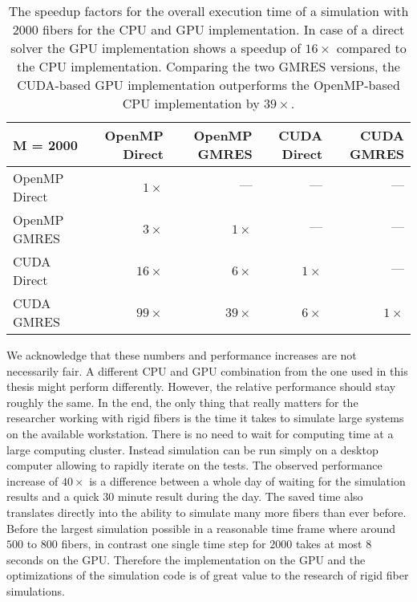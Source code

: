 \begin{table}[!htbp]
  \begin{center}
    \begin{tabulary}{\textwidth}{lRRRR}
      \toprule
      M = 2000 & OpenMP Direct & OpenMP GMRES & CUDA Direct & CUDA GMRES \\
      \midrule
      OpenMP Direct & $1×$  & $—$   & $—$ & $—$ \\
      OpenMP GMRES  & $3×$  & $1×$  & $—$ & $—$ \\
      CUDA Direct   & $16×$ & $6×$  & $1×$ & $—$ \\
      CUDA GMRES    & $99×$ & $39×$ & $6×$ & $1×$ \\
      \bottomrule
    \end{tabulary}
  \end{center}
  \caption[Speedup factors for overall execution time.]{The speedup factors for the overall execution time of a simulation with $2000$ fibers for the CPU and GPU implementation. In case of a direct solver the GPU implementation shows a speedup of $16×$ compared to the CPU implementation. Comparing the two GMRES versions, the CUDA-based GPU implementation outperforms the OpenMP-based CPU implementation by $39×$.}
  \label{tab:overall_speedup}
\end{table}

We acknowledge that these numbers and performance increases are not necessarily fair. A different CPU and GPU combination from the one used in this thesis might perform differently. However, the relative performance should stay roughly the same. In the end, the only thing that really matters for the researcher working with rigid fibers is the time it takes to simulate large systems on the available workstation. There is no need to wait for computing time at a large computing cluster. Instead simulation can be run simply on a desktop computer allowing to rapidly iterate on the tests. The observed performance increase of $40×$ is a difference between a whole day of waiting for the simulation results and a quick $30$ minute result during the day. The saved time also translates directly into the ability to simulate many more fibers than ever before. Before the largest simulation possible in a reasonable time frame where around $500$ to $800$ fibers, in contrast one single time step for $2000$ takes at most $8$ seconds on the GPU. Therefore the implementation on the GPU and the optimizations of the simulation code is of great value to the research of rigid fiber simulations.
